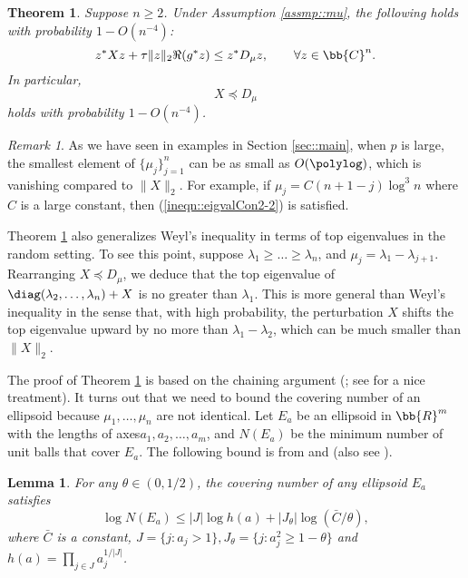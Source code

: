 \documentclass[12pt]{article}%
\theoremstyle{plain}%
\newtheorem{thm}{Theorem}[section]
\newtheorem{lem}{Lemma}[section]
\theoremstyle{remark}
\newtheorem{rmk}{Remark}[section]
\begin{document}
\begin{thm}\label{thm::eigvalPtb}
Suppose $n \ge 2$. Under Assumption \ref{assmp::mu}, the following holds with probability $1 - O(n^{-4})$:
\begin{equation}\label{ineqn::eigval1}
z^* X z + \tau \| z \|_2 \Re(g^* z) \le z^* D_\mu z, \qquad \forall z \in \bb{C}^n. 
\end{equation}
In particular, 
\begin{equation*}
X \preceq D_{\mu}
\end{equation*}
holds with probability $1 - O(n^{-4})$. 
\end{thm}

\begin{rmk}
As we have seen in examples in Section \ref{sec::main}, when $p$ is large, the smallest element of $\{ \mu_j \}_{j=1}^n$ can be as small as $O(\polylog)$, which is vanishing compared to $\| X \|_2$. For example, if $\mu_j = C(n+1-j)\log^3 n$ where $C$ is a large constant, then (\ref{ineqn::eigvalCon2-2}) is satisfied.

Theorem \ref{thm::eigvalPtb} also generalizes Weyl's inequality in terms of top eigenvalues in the random setting. To see this point, suppose $\lambda_1 \ge \ldots \ge \lambda_n$, and $\mu_j = \lambda_1 - \lambda_{j+1}$. Rearranging $X \preceq D_{\mu}$, we deduce that the top eigenvalue of $\diag(\lambda_2,\ldots,\lambda_n) + X$ is no greater than $\lambda_1$. This is more general than Weyl's inequality in the sense that, with high probability, the perturbation $X$ shifts the top eigenvalue upward by no more than $\lambda_1 - \lambda_2$, which can be much smaller than $\| X \|_2$.
\end{rmk}
 
\vspace{2mm}

The proof of Theorem \ref{thm::eigvalPtb} is based on the chaining argument (\cite{dudley1967sizes}; see \cite{Van14} for a nice treatment). It turns out that we need to bound the covering number of an ellipsoid because $\mu_1,\ldots,\mu_n$ are not identical. Let $E_a$ be an ellipsoid in $\bb{R}^m$ with the lengths of axes$a_1,a_2,\ldots,a_m$, and $N(E_a)$ be the minimum number of unit balls that cover $E_a$. The following bound is from \cite{Dum04} and \cite{Dum06} (also see \cite{dumer2007covering}).

\begin{lem}\label{lem::covering}
For any $\theta \in (0,1/2)$, the covering number of any ellipsoid $E_a$ satisfies
\begin{equation}
\log N(E_a) \le |J| \log h(a) + |J_{\theta}| \log (\bar{C}/\theta),
\end{equation}
where $\bar{C}$ is a constant, $J = \{j: a_j > 1\}, J_{\theta} = \{j: a_j^2 \ge 1- \theta \}$ and $h(a) = \prod_{j \in J}a_j^{1/|J|}$.
\end{lem}
\end{document}

